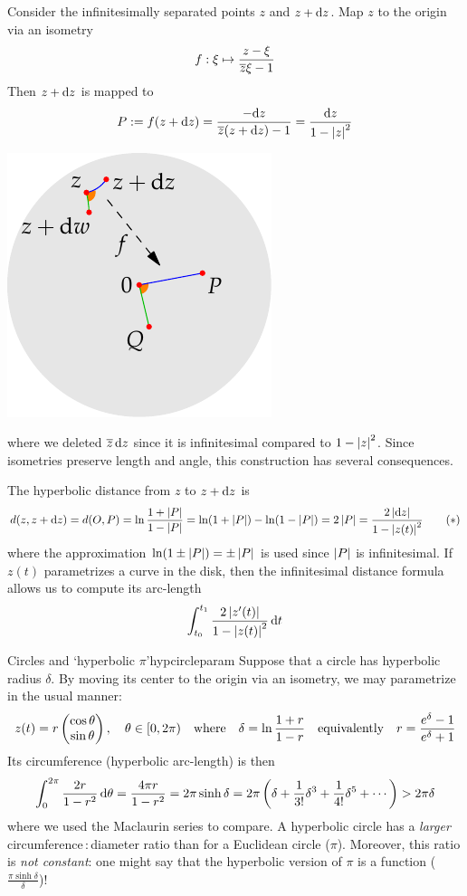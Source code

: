 \begin{minipage}[t]{0.69\linewidth}\vspace{0pt}
	Consider the infinitesimally separated points $z$ and $z+{\mathrm{d} z}$. Map $z$ to the origin via an isometry
	\[
		f:\xi\mapsto \frac{z-\xi}{\overline{z}\xi-1}
	\]
	Then $z+{\mathrm{d} z}$ is mapped to
	\[
		P:=f(z+{\mathrm{d} z})=\frac{-{\mathrm{d} z}}{\overline{z}(z+{\mathrm{d} z})-1} =\frac{{\mathrm{d} z}}{1-\left| z\right|^2}
	\]
\end{minipage}
\hfill
\begin{minipage}[t]{0.3\linewidth}\vspace{0pt}
	\flushright\includegraphics[scale=0.9]{isom-arclength}
\end{minipage}
\medbreak
where we deleted $\overline{z}\,{\mathrm{d} z}$ since it is infinitesimal compared to $1-\left| z\right|^2$.\smallbreak
Since isometries preserve length and angle, this construction has several consequences.


The hyperbolic distance from $z$ to $z+{\mathrm{d} z}$ is
\[
	d(z,z+{\mathrm{d} z})=d(O,P)=\ln\frac{1+\left| P\right|}{1-\left| P\right|} =\ln(1+\left| P\right|)-\ln(1-\left| P\right|)=2\left| P\right|=\frac{2\left| {\mathrm{d} z}\right|}{1-\left| z(t)\right|^2} \tag{$\ast$}
\]
where the approximation $\ln(1\pm\left| P\right|)=\pm\left| P\right|$ is used since $\left| P\right|$ is infinitesimal. If $z(t)$ parametrizes a curve in the disk, then the infinitesimal distance formula allows us to compute its arc-length
\[
	\int_{t_0}^{t_1}\frac{2\left| z'(t)\right|}{1-\left| z(t)\right|^2}\,{\mathrm{d} t}
\]

	
\begin{example}{Circles and `hyperbolic $\pi$'}{hypcircleparam}
	Suppose that a circle has hyperbolic radius $\delta$. By moving its center to the origin via an isometry, we may parametrize in the usual manner:
	\[
		z(t)=r\begin{pmatrix}\cos\theta\\\sin\theta\end{pmatrix},\quad \theta\in[0,2\pi)
		\quad\text{where}\quad 
		\delta=\ln\frac{1+r}{1-r}
		\quad\text{equivalently}\quad
		r=\frac{e^\delta-1}{e^\delta+1}
	\]
	Its circumference (hyperbolic arc-length) is then
	\[
		\int_0^{2\pi}\frac{2 r}{1-r^2}\,{\mathrm{d}\theta} =\frac{4\pi r}{1-r^2} =2\pi\sinh\delta =2\pi\left(\delta+\frac{1}{3!}\delta^3+\frac{1}{4!}\delta^5+\cdots\right)>2\pi\delta
	\]
	where we used the Maclaurin series to compare.\smallbreak
	A hyperbolic circle has a \emph{larger} circumference\,:\,diameter ratio than for a Euclidean circle ($\pi$). Moreover, this ratio is \emph{not constant}: one might say that the hyperbolic version of $\pi$ is a function ($\frac{\pi\sinh\delta}\delta$)!
\end{example}

